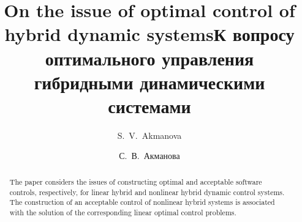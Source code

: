 \begin{englishtitle} %
\title{On the issue of optimal control of hybrid dynamic systems}
\author{S.~V.~Akmanova
}

\maketitle

\begin{abstract}
The paper considers the issues of constructing optimal and acceptable software controls, respectively, for linear hybrid and nonlinear hybrid dynamic control systems. The construction of an acceptable control of nonlinear hybrid systems is associated with the solution of the corresponding linear optimal control problems.

\end{abstract}
\end{englishtitle}


\iffalse
\documentclass[12pt]{llncs}


\usepackage{iftex}

\ifPDFTeX
\usepackage[T2A]{fontenc}
\usepackage[utf8]{inputenc} %
\usepackage[english,russian]{babel}
\fi

\usepackage{todonotes}

\usepackage[russian]{nla}



\fi

\title{К вопросу оптимального управления гибридными динамическими системами }
\author{С.~В.~Акманова
 } %


\maketitle
 
